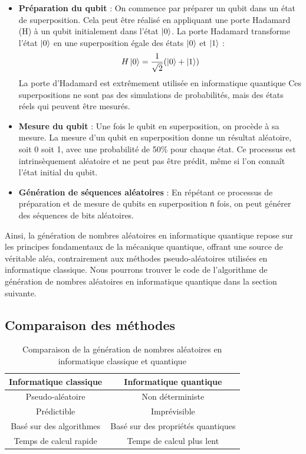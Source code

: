 \documentclass{article}
\begin{document}
\begin{itemize}
  \item \textbf{Préparation du qubit} : On commence par préparer un qubit dans un état de superposition. Cela peut être réalisé en appliquant une porte Hadamard (H) à un qubit initialement dans l'état $\ket{0}$. La porte Hadamard transforme l'état $\ket{0}$ en une superposition égale des états $\ket{0}$ et $\ket{1}$ :
  \[
  H\ket{0} = \frac{1}{\sqrt{2}}(\ket{0} + \ket{1})
  \]
  La porte d'Hadamard est extrêmement utilisée en informatique quantique Ces superpositions ne sont pas des simulations de probabilités, mais des états réels qui peuvent être mesurés.
  \item \textbf{Mesure du qubit} : Une fois le qubit en superposition, on procède à sa mesure. La mesure d'un qubit en superposition donne un résultat aléatoire, soit 0 soit 1, avec une probabilité de 50\% pour chaque état. Ce processus est intrinsèquement aléatoire et ne peut pas être prédit, même si l'on connaît l'état initial du qubit.
  \item \textbf{Génération de séquences aléatoires} : En répétant ce processus de préparation et de mesure de qubits en superposition \texttt{n} fois, on peut générer des séquences de bits aléatoires. 
\end{itemize}

Ainsi, la génération de nombres aléatoires en informatique quantique repose sur les principes
fondamentaux de la mécanique quantique, offrant une source de véritable aléa, contrairement
aux méthodes pseudo-aléatoires utilisées en informatique classique. Nous pourrons trouver le code
de l'algorithme de génération de nombres aléatoires en informatique quantique dans la section suivante.


\subsection{Comparaison des méthodes}

\begin{table}[H]
  \centering
  \begin{tabular}{|c|c|}
    \hline
    \textbf{Informatique classique} & \textbf{Informatique quantique} \\
    \hline
    Pseudo-aléatoire & Non déterministe \\
    \hline
    Prédictible & Imprévisible \\
    \hline
    Basé sur des algorithmes & Basé sur des propriétés quantiques \\
    \hline
    Temps de calcul rapide & Temps de calcul plus lent \\
    \hline
  \end{tabular}
  \caption{Comparaison de la génération de nombres aléatoires en informatique classique et quantique}
\end{table}
\end{document}
